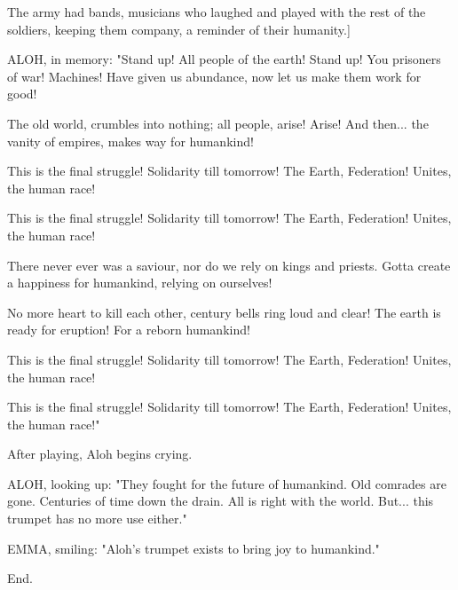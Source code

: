 \documentclass[11pt]{article}
\begin{document}
The army had bands, musicians who laughed and played with the rest of the soldiers, keeping them company, a reminder of their humanity.]

ALOH, in memory: 
"Stand up! All people of the earth!
Stand up! You prisoners of war!
Machines! Have given us abundance,
now let us make them work for good!

The old world, crumbles into nothing;
all people, arise! Arise!
And then... the vanity of empires,
makes way for humankind!

This is the final struggle!
Solidarity till tomorrow!
The Earth, Federation!
Unites, the human race!

This is the final struggle!
Solidarity till tomorrow!
The Earth, Federation!
Unites, the human race!

There never ever was a saviour,
nor do we rely on kings and priests.
Gotta create a happiness for humankind,
relying on ourselves!

No more heart to kill each other,
century bells ring loud and clear!
The earth is ready for eruption!
For a reborn humankind!

This is the final struggle!
Solidarity till tomorrow!
The Earth, Federation!
Unites, the human race!

This is the final struggle!
Solidarity till tomorrow!
The Earth, Federation!
Unites, the human race!"

After playing, Aloh begins crying.

ALOH, looking up: "They fought for the future of humankind.
Old comrades are gone.
Centuries of time down the drain.
All is right with the world.
But... this trumpet has no more use either."

EMMA, smiling: "Aloh's trumpet exists to bring joy to humankind."

End.
\end{document}
